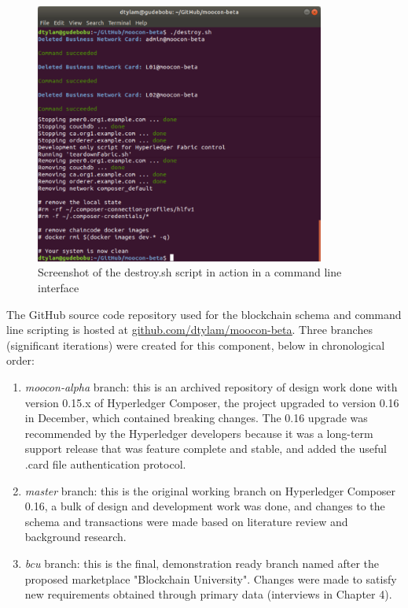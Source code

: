 \begin{enumerate}
\begin{figure}[!ht]
		      \includegraphics[width=0.85\textwidth]{destroysh}
		      \caption[Blockchain Teardown Script Screenshot]
		      {Screenshot of the destroy.sh script in action in a command line interface}
		      \label{fig:destroysh}
	      \end{figure}
\end{enumerate}

The GitHub source code repository used for the blockchain schema and command line scripting
is hosted at \href{https://github.com/dtylam/moocon-beta}{\underline{github.com/dtylam/moocon-beta}}.
Three branches (significant iterations) were created for this component, below in chronological order:
\begin{enumerate}
	\setlength\itemsep{0em}
	\item \textit{moocon-alpha} branch: this is an archived repository of design work done with version 0.15.x of
	      Hyperledger Composer, the project upgraded to version 0.16 in December, which contained breaking changes.
	      The 0.16 upgrade was recommended by the Hyperledger developers because it was a long-term support
	      release that was feature complete and stable, and added the useful .card file authentication protocol.
	\item \textit{master} branch: this is the original working branch on Hyperledger Composer 0.16, a bulk of
	      design and development work was done, and changes to the schema and transactions were made based on
	      literature review and background research.
	\item \textit{bcu} branch: this is the final, demonstration ready branch named after the proposed marketplace
	      "Blockchain University". Changes were made to satisfy new requirements obtained through primary data (interviews in Chapter 4).
\end{enumerate}

